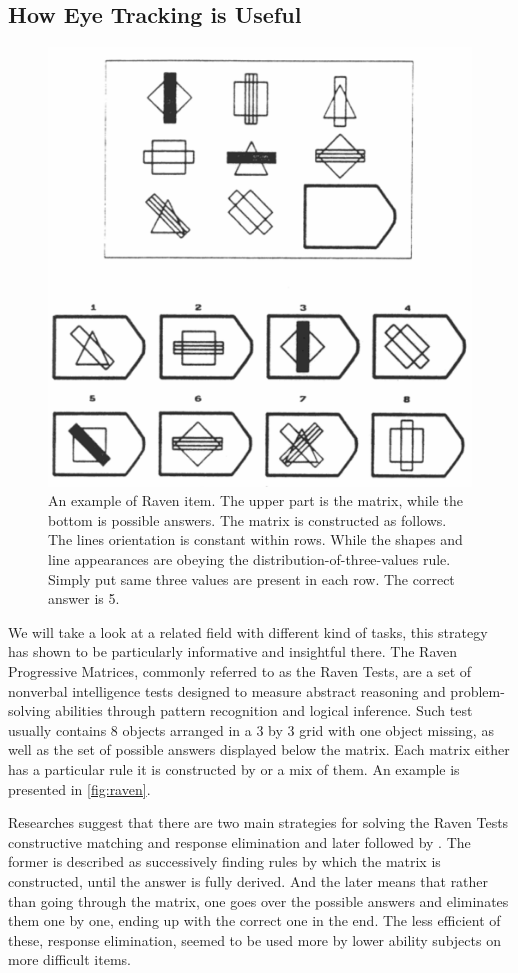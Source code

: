 \documentclass[11pt,a4paper]{article}
\begin{document}
\subsection{How Eye Tracking is Useful}
\begin{figure}
    \centering
    \includegraphics[width=0.5\linewidth]{images/raven_carpenter_1990.png}
    \caption{An example of Raven item. The upper part is the matrix, while the bottom is possible answers. The matrix is constructed as follows. The lines orientation is constant within rows. While the shapes and line appearances are obeying the distribution-of-three-values rule. Simply put same three values are present in each row. The correct answer is 5.}
    \label{fig:raven}
\end{figure}
We will take a look at a related field with different kind of tasks, this strategy has shown to be particularly informative and insightful there. 
The Raven Progressive Matrices, commonly referred to as the Raven Tests, are a set of nonverbal intelligence tests designed to measure abstract reasoning and problem-solving abilities through pattern recognition and logical inference. Such test usually contains 8 objects arranged in a 3 by 3 grid with one object missing, as well as the set of possible answers displayed below the matrix. Each matrix either has a particular rule it is constructed by or a mix of them. An example is presented in \autoref{fig:raven}. 

Researches suggest that there are two main strategies for solving the Raven Tests constructive matching and response elimination \citep{Bethel-Fox_1984} and later followed by \cite{Vigneau_2006}. The former is described as successively finding rules by which the matrix is constructed, until the answer is fully derived. And the later means that rather than going through the matrix, one goes over the possible answers and eliminates them one by one, ending up with the correct one in the end. The less efficient of these, response elimination, seemed to be used more by lower ability subjects on more difficult items. 
\end{document}
